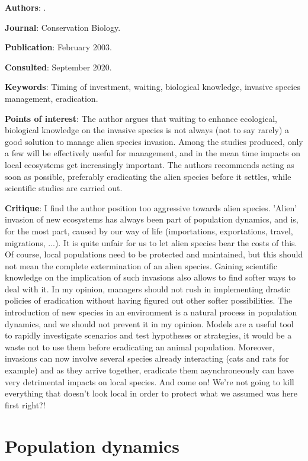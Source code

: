 \documentclass[12pt,a4paper]{article}
\begin{document}
\textbf{Authors}: \cite{simberloff2003information}.

\textbf{Journal}: Conservation Biology.

\textbf{Publication}: February 2003.

\textbf{Consulted}: September 2020.

\textbf{Keywords}: Timing of investment, waiting, biological knowledge, invasive species management, eradication.

\textbf{Points of interest}: The author argues that waiting to enhance ecological, biological knowledge on the invasive species is not always (not to say rarely) a good solution to manage alien species invasion. Among the studies produced, only a few will be effectively useful for management, and in the mean time impacts on local ecosystems get increasingly important. The authors recommends acting as soon as possible, preferably eradicating the alien species before it settles, while scientific studies are carried out.

\textbf{Critique}: I find the author position too aggressive towards alien species. 'Alien' invasion of new ecosystems has always been part of population dynamics, and is, for the most part, caused by our way of life (importations, exportations, travel, migrations, ...). It is quite unfair for us to let alien species bear the costs of this. Of course, local populations need to be protected and maintained, but this should not mean the complete extermination of an alien species. Gaining scientific knowledge on the implication of such invasions also allows to find softer ways to deal with it. In my opinion, managers should not rush in implementing drastic policies of eradication without having figured out other softer possibilities. The introduction of new species in an environment is a natural process in population dynamics, and we should not prevent it in my opinion. Models are a useful tool to rapidly investigate scenarios and test hypotheses or strategies, it would be a waste not to use them before eradicating an animal population. Moreover, invasions can now involve several species already interacting (cats and rats for example) and as they arrive together, eradicate them asynchroneously can have very detrimental impacts on local species. And come on! We're not going to kill everything that doesn't look local in order to protect what we assumed was here first right?!

\newpage

\section*{Population dynamics}
\end{document}
